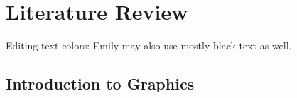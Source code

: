 \documentclass[print]{nuthesis}
\begin{document}




\tableofcontents

\listoffigures
\listoftables

\mainmatter


\hypertarget{literature-review}{%
\chapter{Literature Review}\label{literature-review}}

Editing text colors:  Emily may also use mostly black text as well.  

\hypertarget{introduction-to-graphics}{%
\section{Introduction to Graphics}\label{introduction-to-graphics}}
\end{document}
